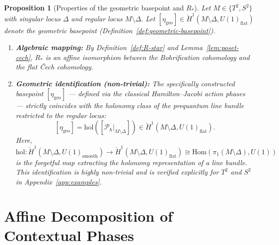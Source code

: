 \documentclass[11pt]{article}
\newtheorem{proposition}[theorem]{Proposition}
\begin{document}
\begin{proposition}[Properties of the geometric basepoint and $R_*$]
\label{prop:main}
Let $M \in \{T^2, S^2\}$ with singular locus $\Delta$ and regular locus
$M \setminus \Delta$. Let
$[\eta_{\mathrm{geo}}] \in \check{H}^1(M \setminus \Delta, U(1)_{\mathrm{flat}})$
denote the geometric basepoint (Definition~\ref{def:geometric-basepoint}).

\begin{enumerate}
\item[(a)] \textbf{Algebraic mapping:} By Definition~\ref{def:R-star} and Lemma~\ref{lem:poset-cech},
$R_*$ is an affine isomorphism between the Bohrification cohomology and the flat \v{C}ech cohomology.

\item[(b)] \textbf{Geometric identification (non-trivial):} The specifically constructed basepoint
$[\eta_{\mathrm{geo}}]$ --- defined via the classical Hamilton--Jacobi action phases ---
strictly coincides with the holonomy class of the prequantum line bundle restricted to the regular locus:
\[
[\eta_{\mathrm{geo}}] = \mathrm{hol}\left([\mathcal{P}_\hbar|_{M \setminus \Delta}]\right)
\in \check{H}^1(M \setminus \Delta, U(1)_{\mathrm{flat}}).
\]
Here, $\mathrm{hol}: \check{H}^1(M \setminus \Delta, U(1)_{\mathrm{smooth}}) \to \check{H}^1(M \setminus \Delta, U(1)_{\mathrm{flat}}) \cong \mathrm{Hom}(\pi_1(M \setminus \Delta), U(1))$ is the forgetful map extracting the holonomy representation of a line bundle.
This identification is highly non-trivial and is verified explicitly for $T^2$ and $S^2$
in Appendix~\ref{app:examples}.
\end{enumerate}
\end{proposition}

\section{Affine Decomposition of Contextual Phases}
\end{document}
